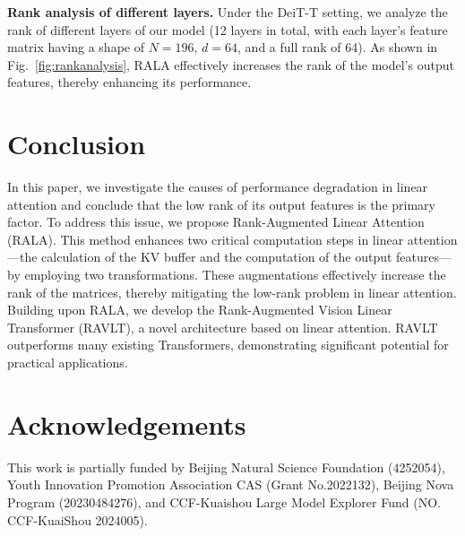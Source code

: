 \documentclass[10pt,twocolumn,letterpaper]{article}
\begin{document}
\textbf{Rank analysis of different layers.} Under the DeiT-T setting, we analyze the rank of different layers of our model (12 layers in total, with each layer's feature matrix having a shape of $N = 196$, $d = 64$, and a full rank of 64). As shown in Fig.~\ref{fig:rankanalysis}, RALA effectively increases the rank of the model's output features, thereby enhancing its performance.

\section{Conclusion}

In this paper, we investigate the causes of performance degradation in linear attention and conclude that the low rank of its output features is the primary factor. To address this issue, we propose Rank-Augmented Linear Attention (RALA). This method enhances two critical computation steps in linear attention---the calculation of the KV buffer and the computation of the output features---by employing two transformations. These augmentations effectively increase the rank of the matrices, thereby mitigating the low-rank problem in linear attention. Building upon RALA, we develop the Rank-Augmented Vision Linear Transformer (RAVLT), a novel architecture based on linear attention. RAVLT outperforms many existing Transformers, demonstrating significant potential for practical applications.

\section*{Acknowledgements}

This work is partially funded by Beijing Natural Science Foundation (4252054), Youth Innovation Promotion Association CAS (Grant No.2022132), Beijing Nova Program (20230484276), and CCF-Kuaishou Large Model Explorer Fund (NO. CCF-KuaiShou 2024005).



\end{document}
